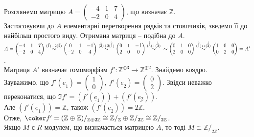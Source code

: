 \documentclass{math_library}
\begin{document}
\begin{example}
Розглянемо матрицю $A = \begin{pmatrix}
-4 & 1 & 7 \\
-2 & 0 & 4
\end{pmatrix}$, що визначає $\mathbb{Z}$.\\
Застосовуючи до $A$ елементарні перетворення рядків та стовпчиків, зведемо її до найбільш простого виду. Отримана матриця -- подібна до $A$.\\
$A = \begin{pmatrix}
-4 & 1 & 7 \\
-2 & 0 & 4
\end{pmatrix} \overset{\substack{(\vec{1}) - 2 (\vec{2})}}{\sim} \begin{pmatrix}
0 & 1 & -1 \\
-2 & 0 & 4
\end{pmatrix} \overset{\substack{\overset{\downarrow}{(3)} + 2 \overset{\downarrow}{(1)}}}{\sim} \begin{pmatrix}
0 & 1 & -1 \\
2 & 0 & 0
\end{pmatrix} \overset{\substack{\overset{\downarrow}{(3)} + \overset{\downarrow}{(2)}}}{\sim} \\ \sim \begin{pmatrix}
0 & 1 & 0 \\
2 & 0 & 0
\end{pmatrix} \overset{\substack{\overset{\downarrow}{(1)} \leftrightarrow \overset{\downarrow}{(2)}}}{\sim} \begin{pmatrix}
1 & 0 & 0 \\
0 & 2 & 0
\end{pmatrix} = A'$.\\
Матриця $A'$ визначає гомоморфізм $f' \colon \mathbb{Z}^{\oplus 3} \to \mathbb{Z}^{\oplus 2}$. Знайдемо коядро.\\
Зауважимо, що $f'(\underline{e}_1) = \begin{pmatrix}
1 \\ 0
\end{pmatrix},\ f'(\underline{e}_2) = \begin{pmatrix}
0 \\ 2
\end{pmatrix}$. Звідси неважко переконатися, що $\Im f' = (f'(\underline{e}_1)) + (f'(\underline{e_2}))$.\\
Але $(f'(\underline{e}_1)) = \mathbb{Z}$, також $(f'(\underline{e}_2)) = 2\mathbb{Z}$.\\
Отже, $\coker f' = (\mathbb{Z} \oplus \mathbb{Z})/_{\mathbb{Z} \oplus 2 \mathbb{Z}} \cong \mathbb{Z}/_{\mathbb{Z}} \oplus \mathbb{Z}/_{2 \mathbb{Z}} \cong \mathbb{Z}/_{2 \mathbb{Z}}$.\\
Якщо $M$ є $R$-модулем, що визначається матрицею $A$, то тоді $M \cong \mathbb{Z}/_{2 \mathbb{Z}}$.
\end{example}
\end{document}

